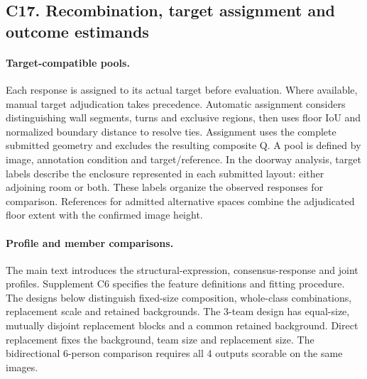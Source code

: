 \subsection*{C17. Recombination, target assignment and outcome estimands}

\paragraph{Target-compatible pools.}
Each response is assigned to its actual target before evaluation. Where available, manual target adjudication takes precedence. Automatic assignment considers distinguishing wall segments, turns and exclusive regions, then uses floor IoU and normalized boundary distance to resolve ties. Assignment uses the complete submitted geometry and excludes the resulting composite Q. A pool is defined by image, annotation condition and target/reference. In the doorway analysis, target labels describe the enclosure represented in each submitted layout: either adjoining room or both. These labels organize the observed responses for comparison. References for admitted alternative spaces combine the adjudicated floor extent with the confirmed image height.

\paragraph{Profile and member comparisons.}
The main text introduces the structural-expression, consensus-response and joint profiles. Supplement C6 specifies the feature definitions and fitting procedure. The designs below distinguish fixed-size composition, whole-class combinations, replacement scale and retained backgrounds. The 3-team design has equal-size, mutually disjoint replacement blocks and a common retained background. Direct replacement fixes the background, team size and replacement size. The bidirectional 6-person comparison requires all 4 outputs scorable on the same images.


